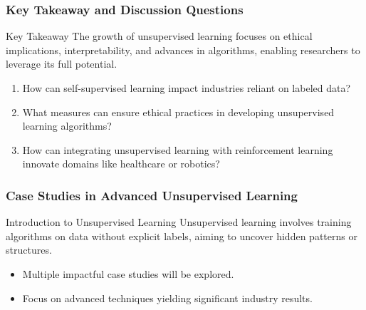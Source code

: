\documentclass[aspectratio=169]{beamer}
\begin{document}
\begin{frame}[fragile]
    \frametitle{Key Takeaway and Discussion Questions}
    \begin{block}{Key Takeaway}
        The growth of unsupervised learning focuses on ethical implications, interpretability, and advances in algorithms, enabling researchers to leverage its full potential.
    \end{block}
    
    \begin{enumerate}
        \item How can self-supervised learning impact industries reliant on labeled data?
        \item What measures can ensure ethical practices in developing unsupervised learning algorithms?
        \item How can integrating unsupervised learning with reinforcement learning innovate domains like healthcare or robotics? 
    \end{enumerate}
\end{frame}

\begin{frame}[fragile]
    \frametitle{Case Studies in Advanced Unsupervised Learning}
    
    \begin{block}{Introduction to Unsupervised Learning}
        Unsupervised learning involves training algorithms on data without explicit labels, aiming to uncover hidden patterns or structures.
    \end{block}
    
    \begin{itemize}
        \item Multiple impactful case studies will be explored.
        \item Focus on advanced techniques yielding significant industry results.
    \end{itemize}
\end{frame}
\end{document}
